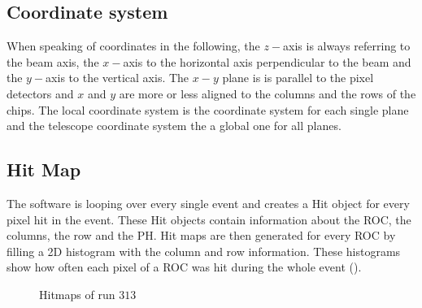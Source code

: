 \documentclass[british,11pt,a4paper]{memoir}
\begin{document}
\subsection{Coordinate system}
When speaking of coordinates in the following, the $z-$axis is always referring to the beam axis, the $x-$axis to the horizontal axis perpendicular to the beam and the $y-$axis to the vertical axis.  The $x-y$ plane is is parallel to the pixel detectors and $x$ and $y$ are more or less aligned to the columns and the rows of the chips. The local coordinate system is the coordinate system for each single plane and the telescope coordinate system the a global one for all planes.
\subsection{Hit Map}
The software is looping over every single event and creates a Hit object for every pixel hit in the event. These Hit objects contain information about the \ac{ROC}, the columns, the row and the \ac{PH}. Hit maps are then generated for every \ac{ROC} by filling a 2D histogram with the column and row information. These histograms show how often each pixel of a \ac{ROC} was hit during the whole event ().
\begin{figure}[ht]
	\centering
	\hfill
	\caption{Hitmaps of run $313$}
	\label{phitmap}
\end{figure}\no
\end{document}
